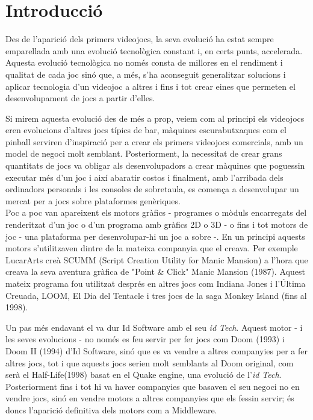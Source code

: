 \chapter{Introducció}

Des de l'aparició dels primers videojocs, la seva evolució ha estat sempre emparellada amb una evolució tecnològica constant i, en certs punts, accelerada. Aquesta evolució tecnològica no només consta de millores en el rendiment i qualitat de cada joc sinó que, a més, s'ha aconseguit generalitzar solucions i aplicar tecnologia d'un videojoc a altres i fins i tot crear eines que permeten el desenvolupament de jocs a partir d'elles.

Si mirem aquesta evolució des de més a prop, veiem com al principi els videojocs eren evolucions d'altres jocs típics de bar, màquines escurabutxaques com el pinball serviren d'inspiració per a crear els primers videojocs comercials, amb un model de negoci molt semblant. Posteriorment, la necessitat de crear grans quantitats de jocs va obligar als desenvolupadors a crear màquines que poguessin executar més d'un joc i així abaratir costos i finalment, amb l'arribada dels ordinadors personals i les consoles de sobretaula, es comença a desenvolupar un mercat per a jocs sobre plataformes genèriques.
\\

Poc a poc van apareixent els motors gràfics - programes o mòduls encarregats del renderitzat d'un joc o d'un programa amb gràfics 2D o 3D - o fins i tot motors de joc - una plataforma per desenvolupar-hi un joc a sobre -. En un principi aquests motors s'utilitzaven dintre de la mateixa companyia que el creava. Per exemple LucarArts creà {SCUMM} ({Script Creation Utility for Manic Mansion}) a l'hora que creava la seva aventura gràfica de "Point \& Click" Manic Mansion (1987). Aquest mateix programa fou utilitzat després en altres jocs com Indiana Jones i l'Última Creuada, LOOM, El Dia del Tentacle i tres jocs de la saga Monkey Island (fins al 1998).

Un pas més endavant el va dur Id Software amb el seu {\em id Tech}. Aquest motor - i les seves evolucions - no només es feu servir per fer jocs com Doom (1993) i Doom II (1994) d'Id Software, sinó que es va vendre a altres companyies per a fer altres jocs, tot i que aquests jocs serien molt semblants al Doom original, com serà el Half-Life(1998) basat en el Quake engine, una evolució de l'{\em id Tech}. Posteriorment fins i tot hi va haver companyies que basaven el seu negoci no en vendre jocs, sinó en vendre motors a altres companyies que els fessin servir; és doncs l'aparició definitiva dels motors com a Middleware.
\\

